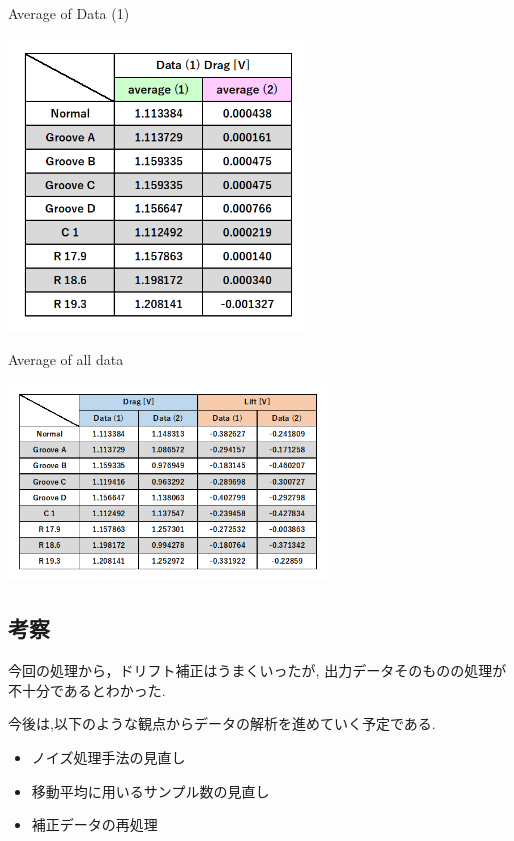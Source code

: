 \documentclass[twocolumn,a4j]{jsarticle}
\begin{document}
\begin{table}[htbp]
    \footnotesize
    \caption{Average of Data (1)}
    \begin{center}
        \includegraphics[width=80mm]{images/Picture2.png}
    \end{center}
\end{table}
\begin{table}[htbp]
    \footnotesize
    \caption{Average of all data}
    \begin{center}
        \includegraphics[width=85mm]{images/Picture1.png}
    \end{center}
\end{table}
\newpage
\subsection{考察}
今回の処理から，ドリフト補正はうまくいったが,
出力データそのものの処理が不十分であるとわかった.\par
今後は,以下のような観点からデータの解析を進めていく予定である.
\begin{itemize}
    \item ノイズ処理手法の見直し
    \item 移動平均に用いるサンプル数の見直し
    \item 補正データの再処理
\end{itemize}
\end{document}
